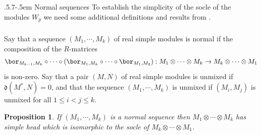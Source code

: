 \documentclass[11pt,reqno]{amsart}
\makeatletter
\newtheorem*{prop}{Proposition}
\theoremstyle{definition} \newtheorem*{defn}{Definition}
\theoremstyle{definition}
\numberwithin{equation}{section}
\newcommand{\lie}[1]{\mathfrak{#1}}
\def\subsection{\def\@secnumfont{\bfseries}\@startsection{subsection}{2}%
  {\parindent}{.5\linespacing\@plus.7\linespacing}{-.5em}%
  {\normalfont\bfseries}}
\makeatother
\begin{document}
 \subsection{Normal sequences} To establish the simplicity of the socle of the modules $W_p$ we need some additional definitions and results from \cite{KKOP}.
 \subsubsection{}  Say that a sequence $(M_1,\cdots, M_k)$ of real simple modules is normal if the composition of the $R$-matrices
$$\bor_{M_{k-1},M_k}\circ \cdots \circ (\bor_{M_1,M_k}\circ\cdots\circ\bor_{M_1,M_2}): M_1\otimes \cdots \otimes M_k \to M_k \otimes \cdots\otimes M_1$$
is non-zero. Say that a pair $(M,N)$ of real simple modules is unmixed if $\lie d(M^*,N)=0$, and that the sequence $(M_1,\cdots,M_k)$ is unmixed if $(M_i,M_j)$ is unmixed for all $1\le i<j\le k$.
\begin{prop}\cite[Lemma 4.15]{KKOP}\label{simplehead}
    If $(M_1,\cdots, M_k)$ is a normal sequence then $M_1\otimes \cdots\otimes M_k$ has simple head which is isomorphic to the socle of $M_k\otimes\cdots\otimes M_1$.
\end{prop}
\end{document}
